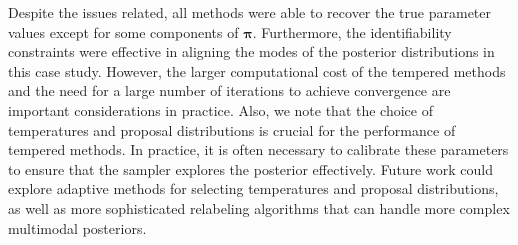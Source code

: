 \documentclass[11pt]{article}
\newcommand{\bpi}{\boldsymbol{\pi}}
\begin{document}
Despite the issues related, all methods were able to recover the true parameter values except for some
components of $\bpi$. Furthermore, the identifiability constraints were effective in aligning the modes of the
posterior distributions in this case study. However, the larger computational cost of the tempered methods
and the need for a large number of iterations to achieve convergence are important considerations in practice. 
Also, we note that the choice of temperatures and proposal distributions is crucial for the performance of
tempered methods. In practice, it is often necessary to calibrate these parameters to ensure that the
sampler explores the posterior effectively. Future work could explore adaptive methods for selecting
temperatures and proposal distributions, as well as more sophisticated relabeling algorithms that can handle
more complex multimodal posteriors.

\clearpage



\end{document}
